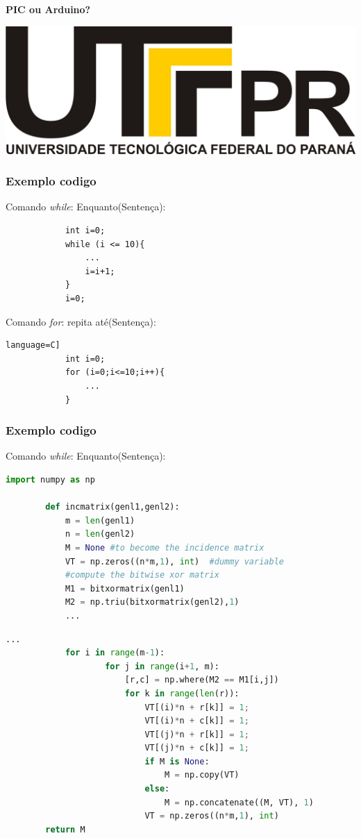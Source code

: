\documentclass[t]{beamer}
\begin{document}
\begin{frame}[c]
	\textbf{PIC ou Arduino?}
	\begin{center}
		\includegraphics[width=1.3\textwidth]{images/logo.jpg}
	\end{center}
\end{frame}

\begin{frame}[fragile]
	\frametitle{Exemplo codigo}
		Comando \textit{while}: Enquanto(Sentença):
		\begin{lstlisting}
			int i=0;
			while (i <= 10){
				...
				i=i+1;
			}
			i=0;
		\end{lstlisting}
			Comando \textit{for}: repita até(Sentença):
		\begin{lstlisting}language=C]
			int i=0;
			for (i=0;i<=10;i++){
				...
			}
		\end{lstlisting}
\end{frame}

\begin{frame}[fragile]
	\frametitle{Exemplo codigo}
	Comando \textit{while}: Enquanto(Sentença):

	\begin{lstlisting}[language=Python]
		import numpy as np
		
		def incmatrix(genl1,genl2):
			m = len(genl1)
			n = len(genl2)
			M = None #to become the incidence matrix
			VT = np.zeros((n*m,1), int)  #dummy variable
			#compute the bitwise xor matrix
			M1 = bitxormatrix(genl1)
			M2 = np.triu(bitxormatrix(genl2),1) 
			... 
	\end{lstlisting}
\end{frame}


\begin{frame}[fragile]

	\begin{lstlisting}[language=Python]
			... 
			for i in range(m-1):
					for j in range(i+1, m):
						[r,c] = np.where(M2 == M1[i,j])
						for k in range(len(r)):
							VT[(i)*n + r[k]] = 1;
							VT[(i)*n + c[k]] = 1;
							VT[(j)*n + r[k]] = 1;
							VT[(j)*n + c[k]] = 1;
							if M is None:
								M = np.copy(VT)
							else:
								M = np.concatenate((M, VT), 1)
							VT = np.zeros((n*m,1), int)
		return M
	\end{lstlisting}
\end{frame}
\end{document}

